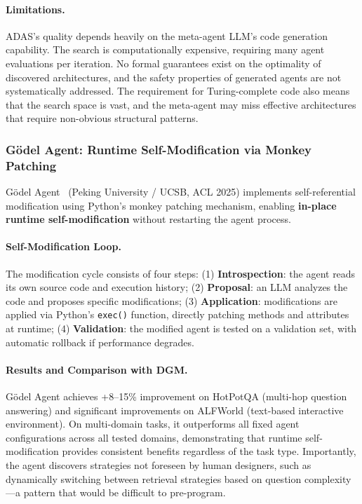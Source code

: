 \paragraph{Limitations.}
ADAS's quality depends heavily on the meta-agent LLM's code generation capability. The search is computationally expensive, requiring many agent evaluations per iteration. No formal guarantees exist on the optimality of discovered architectures, and the safety properties of generated agents are not systematically addressed. The requirement for Turing-complete code also means that the search space is vast, and the meta-agent may miss effective architectures that require non-obvious structural patterns.


\subsubsection{G\"{o}del Agent: Runtime Self-Modification via Monkey Patching}

G\"{o}del Agent~\citep{godelagent2024} (Peking University / UCSB, ACL 2025) implements self-referential modification using Python's monkey patching mechanism, enabling \textbf{in-place runtime self-modification} without restarting the agent process.

\paragraph{Self-Modification Loop.}
The modification cycle consists of four steps: (1) \textbf{Introspection}: the agent reads its own source code and execution history; (2) \textbf{Proposal}: an LLM analyzes the code and proposes specific modifications; (3) \textbf{Application}: modifications are applied via Python's \texttt{exec()} function, directly patching methods and attributes at runtime; (4) \textbf{Validation}: the modified agent is tested on a validation set, with automatic rollback if performance degrades.

\paragraph{Results and Comparison with DGM.}
G\"{o}del Agent achieves +8--15\% improvement on HotPotQA (multi-hop question answering) and significant improvements on ALFWorld (text-based interactive environment). On multi-domain tasks, it outperforms all fixed agent configurations across all tested domains, demonstrating that runtime self-modification provides consistent benefits regardless of the task type. Importantly, the agent discovers strategies not foreseen by human designers, such as dynamically switching between retrieval strategies based on question complexity---a pattern that would be difficult to pre-program.

